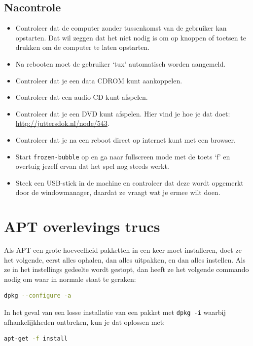 \documentclass[12pt,a4paper]{article}
\begin{document}
\subsection{Nacontrole}
\begin{itemize}
	\item Controleer dat de computer zonder tussenkomst van de gebruiker kan opstarten. Dat wil zeggen dat het niet nodig is om op knoppen of toetsen te drukken om de computer te laten opstarten.
	\item Na rebooten moet de gebruiker `tux' automatisch worden aangemeld.
	\item Controleer dat je een data CDROM kunt aankoppelen.
  \item Controleer dat een audio CD kunt afspelen.
  \item Controleer dat je een DVD kunt afspelen. Hier vind je hoe je dat doet:\\ \url{http://juttersdok.nl/node/543}.
	\item Controleer dat je na een reboot direct op internet kunt met een browser.
	\item Start \texttt{frozen-bubble} op en ga naar fullscreen mode met de toets `f' en overtuig jezelf ervan dat het spel nog steeds werkt.
  \item Steek een USB-stick in de machine en controleer dat deze wordt opgemerkt door de windowmanager, daardat ze vraagt wat je ermee wilt doen.
\end{itemize}
\appendix
\section{APT overlevings trucs}
Als APT een grote hoeveelheid pakketten in een keer moet installeren, doet ze het volgende, eerst alles ophalen, dan alles uitpakken, en dan alles instellen. Als ze in het instellings gedeelte wordt gestopt, dan heeft ze het volgende commando nodig om waar in normale staat te geraken:
\begin{lstlisting}[language=bash]
dpkg --configure -a
\end{lstlisting}

In het geval van een losse installatie van een pakket met \texttt{dpkg -i} waarbij afhankelijkheden ontbreken, kun je dat oplossen met:
\begin{lstlisting}[language=bash]
apt-get -f install
\end{lstlisting}

\end{document}
